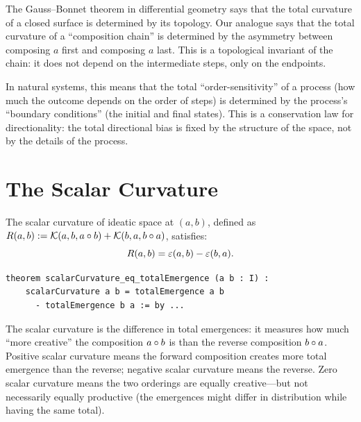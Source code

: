 \begin{interpretation}
The Gauss--Bonnet theorem in differential geometry says that the total curvature
of a closed surface is determined by its topology. Our analogue says that the
total curvature of a ``composition chain'' is determined by the asymmetry between
composing $a$ first and composing $a$ last. This is a topological invariant of
the chain: it does not depend on the intermediate steps, only on the endpoints.

In natural systems, this means that the total ``order-sensitivity'' of a process
(how much the outcome depends on the order of steps) is determined by the
process's ``boundary conditions'' (the initial and final states). This is a
conservation law for directionality: the total directional bias is fixed by the
structure of the space, not by the details of the process.
\end{interpretation}


\section{The Scalar Curvature}

\begin{theorem}
\label{thm:scalar-curvature}
The scalar curvature of ideatic space at $(a, b)$, defined as
$R(a,b) := \mathcal{K}(a,b,a \circ b) + \mathcal{K}(b,a,b \circ a)$,
satisfies:
\[
  R(a,b) = \varepsilon(a,b) - \varepsilon(b,a).
\]
\end{theorem}

\begin{lstlisting}[caption={Scalar curvature (IDT\_v3\_Emergence.lean)}]
theorem scalarCurvature_eq_totalEmergence (a b : I) :
    scalarCurvature a b = totalEmergence a b
      - totalEmergence b a := by ...
\end{lstlisting}

\begin{interpretation}
The scalar curvature is the difference in total emergences: it measures how much
``more creative'' the composition $a \circ b$ is than the reverse composition
$b \circ a$. Positive scalar curvature means the forward composition creates
more total emergence than the reverse; negative scalar curvature means the reverse.
Zero scalar curvature means the two orderings are equally creative---but not
necessarily equally productive (the emergences might differ in distribution while
having the same total).
\end{interpretation}

